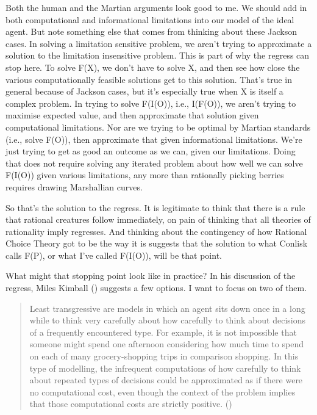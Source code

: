 \documentclass[
  10pt,
  letterpaper,
  twoside]{scrbook}
\begin{document}
Both the human and the Martian arguments look good to me. We should add
in both computational and informational limitations into our model of
the ideal agent. But note something else that comes from thinking about
these Jackson cases. In solving a limitation sensitive problem, we
aren't trying to approximate a solution to the limitation insensitive
problem. This is part of why the regress can stop here. To solve F(X),
we don't have to solve X, and then see how close the various
computationally feasible solutions get to this solution. That's true in
general because of Jackson cases, but it's especially true when X is
itself a complex problem. In trying to solve F(I(O)), i.e., I(F(O)), we
aren't trying to maximise expected value, and then approximate that
solution given computational limitations. Nor are we trying to be
optimal by Martian standards (i.e., solve F(O)), then approximate that
given informational limitations. We're just trying to get as good an
outcome as we can, given our limitations. Doing that does not require
solving any iterated problem about how well we can solve F(I(O)) given
various limitations, any more than rationally picking berries requires
drawing Marshallian curves.

So that's the solution to the regress. It is legitimate to think that
there is a rule that rational creatures follow immediately, on pain of
thinking that all theories of rationality imply regresses. And thinking
about the contingency of how Rational Choice Theory got to be the way it
is suggests that the solution to what Conlisk calls F(P), or what I've
called F(I(O)), will be that point.

What might that stopping point look like in practice? In his discussion
of the regress, Miles Kimball ()
suggests a few options. I want to focus on two of them.

\begin{quote}
Least transgressive are models in which an agent sits down once in a
long while to think very carefully about how carefully to think about
decisions of a frequently encountered type. For example, it is not
impossible that someone might spend one afternoon considering how much
time to spend on each of many grocery-shopping trips in comparison
shopping. In this type of modelling, the infrequent computations of how
carefully to think about repeated types of decisions could be
approximated as if there were no computational cost, even though the
context of the problem implies that those computational costs are
strictly positive. ()
\end{quote}
\end{document}

